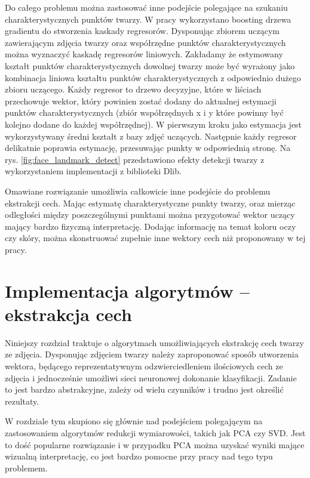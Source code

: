 \documentclass[oneside, eng]{mgr}
\begin{document}
Do całego problemu można zastosować inne podejście polegające na szukaniu charakterystycznych punktów twarzy. W pracy \cite{Landmark face detector} wykorzystano boosting drzewa gradientu do stworzenia kaskady regresorów. Dysponując zbiorem uczącym zawierającym zdjęcia twarzy oraz współrzędne punktów charakterystycznych można wyznaczyć kaskadę regresorów liniowych. Zakładamy że estymowany kształt punktów charakterystycznych dowolnej twarzy może być wyrażony jako kombinacja liniowa kształtu punktów charakterystycznych z odpowiednio dużego zbioru uczącego. Każdy regresor to drzewo decyzyjne, które w liściach przechowuje wektor, który powinien zostać dodany do aktualnej estymacji punktów charakterystycznych (zbiór współrzędnych x i y które powinny być kolejno dodane do każdej współrzędnej). W pierwszym kroku jako estymacja jest wykorzystywany średni kształt z bazy zdjęć uczących. Następnie każdy regresor delikatnie poprawia estymację, przesuwając punkty w odpowiednią stronę. Na rys. \ref{fig:face_landmark_detect} przedstawiono efekty detekcji twarzy z wykorzystaniem implementacji z biblioteki Dlib.

Omawiane rozwiązanie umożliwia całkowicie inne podejście do problemu ekstrakcji cech. Mając estymatę charakterystyczne punkty twarzy, oraz mierząc odległości między poszczególnymi punktami można przygotować wektor uczący mający bardzo fizyczną interpretację. Dodając informację na temat koloru oczy czy skóry, można skonstruować zupełnie inne wektory cech niż proponowany w tej pracy. 

\newpage
 
\chapter{Implementacja algorytmów – ekstrakcja cech}

Niniejszy rozdział traktuje o algorytmach umożliwiających ekstrakcję cech twarzy ze zdjęcia. Dysponując zdjęciem twarzy należy zaproponować sposób utworzenia wektora, będącego reprezentatywnym odzwierciedleniem ilościowych cech ze zdjęcia i jednocześnie umożliwi sieci neuronowej dokonanie klasyfikacji. Zadanie to jest bardzo abstrakcyjne, zależy od wielu czynników i trudno jest określić rezultaty.

W rozdziale tym skupiono się głównie nad podejściem polegającym na zastosowaniem algorytmów redukcji wymiarowości, takich jak PCA czy SVD. Jest to dość popularne rozwiązanie i w przypadku PCA można uzyskać wyniki mające wizualną interpretację, co jest bardzo pomocne przy pracy nad tego typu problemem.
\end{document}
